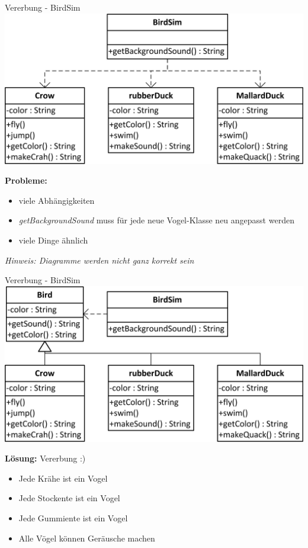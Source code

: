 \documentclass[18pt]{beamer}
\begin{document}
\begin{frame}{Vererbung - BirdSim}
	\includegraphics[scale=1]{bilder/uml/uml1.jpg}
	
	\textbf{Probleme:} 
	\begin{itemize}
		\item viele Abhängigkeiten
		\item \textit{getBackgroundSound} muss für jede neue Vogel-Klasse neu angepasst werden
		\item viele Dinge ähnlich
	\end{itemize}
	
	\emph{Hinweis: Diagramme werden nicht ganz korrekt sein}
\end{frame}


\begin{frame}{Vererbung - BirdSim}
	\includegraphics[scale=1]{bilder/uml/uml2.jpg}
	
	\textbf{Lösung:} Vererbung :)
	\begin{itemize}
		\item Jede Krähe ist ein Vogel
		\item Jede Stockente ist ein Vogel
		\item Jede Gummiente ist ein Vogel\pause
		\item Alle Vögel können Geräusche machen
	\end{itemize}
	
\end{frame}
\end{document}
